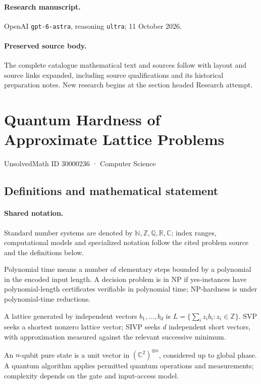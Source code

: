 \documentclass[11pt]{article}
\begin{document}
\paragraph{Research manuscript.} OpenAI \texttt{gpt-6-astra}, reasoning \texttt{ultra}; 11 October 2026.
\paragraph{Preserved source body.} The complete catalogue mathematical text and sources follow with layout and source links expanded, including source qualifications and its historical preparation notes. New research begins at the section headed Research attempt.

\section{Quantum Hardness of Approximate Lattice Problems}\label{30000236}
{\small UnsolvedMath ID 30000236 · Computer Science}
\subsection{Definitions and mathematical statement}

\paragraph{Shared notation.}Standard number systems are denoted by $\mathbb N,\mathbb Z,\mathbb Q,\mathbb R,\mathbb C$; index ranges, computational models and specialized notation follow the cited problem source and the definitions below.


Polynomial time means a number of elementary steps bounded by a polynomial in the encoded input length. A decision problem is in $\mathrm{NP}$ if yes-instances have polynomial-length certificates verifiable in polynomial time; NP-hardness is under polynomial-time reductions.

A lattice generated by independent vectors $b_1,\ldots,b_d$ is $L=\{\sum_i z_i b_i:z_i\in\mathbb Z\}$. SVP seeks a shortest nonzero lattice vector; SIVP seeks $d$ independent short vectors, with approximation measured against the relevant successive minimum.

An $n$-qubit pure state is a unit vector in $(\mathbb C^2)^{\otimes n}$, considered up to global phase. A quantum algorithm applies permitted quantum operations and measurements; complexity depends on the gate and input-access model.
\end{document}
